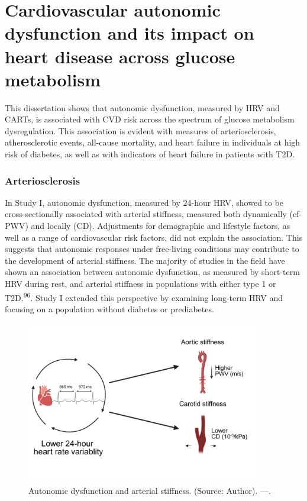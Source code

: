 \documentclass[
  letterpaper,
  headsepline=true,
  open=any]{scrbook}
\begin{document}
\hypertarget{cardiovascular-autonomic-dysfunction-and-its-impact-on-heart-disease-across-glucose-metabolism}{%
\section{Cardiovascular autonomic dysfunction and its impact on heart
disease across glucose
metabolism}\label{cardiovascular-autonomic-dysfunction-and-its-impact-on-heart-disease-across-glucose-metabolism}}

This dissertation shows that autonomic dysfunction, measured by HRV and
CARTs, is associated with CVD risk across the spectrum of glucose
metabolism dysregulation. This association is evident with measures of
arteriosclerosis, atherosclerotic events, all-cause mortality, and heart
failure in individuals at high risk of diabetes, as well as with
indicators of heart failure in patients with T2D.

\hypertarget{arteriosclerosis-1}{%
\subsubsection{Arteriosclerosis}\label{arteriosclerosis-1}}

In Study I, autonomic dysfunction, measured by 24-hour HRV, showed to be
cross-sectionally associated with arterial stiffness, measured both
dynamically (cf-PWV) and locally (CD). Adjustments for demographic and
lifestyle factors, as well as a range of cardiovascular risk factors,
did not explain the association. This suggests that autonomic responses
under free-living conditions may contribute to the development of
arterial stiffness. The majority of studies in the field have shown an
association between autonomic dysfunction, as measured by short-term HRV
during rest, and arterial stiffness in populations with either type 1 or
T2D.\textsuperscript{96}. Study I extended this perspective by examining
long-term HRV and focusing on a population without diabetes or
prediabetes.

\begin{figure}

{\centering \includegraphics[width=4in,height=\textheight]{images/hrv_arterial_stiffness.pdf}

}

\caption{Autonomic dysfunction and arterial stiffness. (Source: Author).
---.}

\end{figure}
\end{document}
